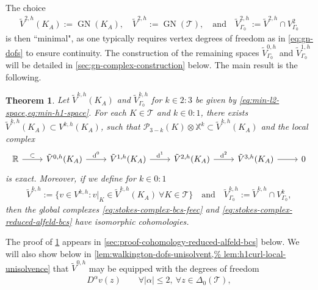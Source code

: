 \documentclass{mcom-l}
\newtheorem{theorem}{Theorem}[section]
\theoremstyle{definition}
\theoremstyle{remark}
\numberwithin{equation}{section}
\DeclareMathOperator{\GN}{GN}
\DeclareMathOperator{\dee}{d}
\newcommand{\mesh}[0]{\mathcal{T}}
\begin{document}
The choice 
\begin{align}
	\label{eq:min-h1-space}
	\tilde{V}^{2, h}(K_A) := \GN(K_A), \quad  
	\tilde{V}^{2, h} := \GN(\mesh), \quad \text{and} \quad 
	\tilde{V}^{2, h}_{\Gamma_0} := \tilde{V}^{2, h} \cap V^2_{\Gamma_0}
\end{align}
is then ``minimal", 
as one typically requires vertex degrees of freedom as in \cref{eq:gn-dofs} 
to ensure continuity. The construction of the remaining spaces 
$\tilde{V}_{\Gamma_0}^{0, h}$ and $\tilde{V}_{\Gamma_0}^{1, h}$ will be detailed in 
\cref{sec:gn-complex-construction} below. The main result is the following.

\begin{theorem}
	\label{thm:cohomology-reduced-alfeld-bcs}
	Let $\tilde{V}^{k, h}(K_A)$ and $\tilde{V}^{k, h}_{\Gamma_0}$ for $k \in 2:3$
	be given by \cref{eq:min-l2-space,eq:min-h1-space}.
	For each $K \in \mesh$ and $k \in 0:1$,
	there exists $\tilde{V}^{k, h}(K_A) \subset V^{k, h}(K_A)$,
	such that
	$\mathcal{P}_{3-k}(K) \otimes \mathbb{X}^k \subset \tilde{V}^{k, h}(K_A)$ 
	and the local complex 
	\begin{equation}
		\label{eq:stokes-complex-reduced-alfeld-element}
		\begin{tikzcd}
			\mathbb{R} \arrow[r, "\subset"] 
			& \tilde{V}^{0, h}(K_A) \arrow[r, "\dee^0"] 
			& \tilde{V}^{1, h}(K_A) \arrow[r, "\dee^1"] 
			& \tilde{V}^{2, h}(K_A) \arrow[r, "\dee^2"]
			& \tilde{V}^{3, h}(K_A) \arrow[r]
			& 0
		\end{tikzcd}
	\end{equation}
	is exact. Moreover, if we define for $k \in 0:1$
	\begin{align}
		\label{eq:min-h2h1curl-space}
		\tilde{V}^{k, h} := \{ v \in V^{k, h} : 
		v|_{K} \in \tilde{V}^{k, h}(K_A) 
		\ \forall K \in \mesh \} 
		\quad \text{and} \quad 
		\tilde{V}^{k, h}_{\Gamma_0} := \tilde{V}^{k, h} \cap V^k_{\Gamma_0},
	\end{align}
	then the global complexes \cref{eq:stokes-complex-bcs-feec} and 
	\cref{eq:stokes-complex-reduced-alfeld-bcs}
	have isomorphic cohomologies.
\end{theorem}
\noindent The proof of \cref{thm:cohomology-reduced-alfeld-bcs} appears in 
\cref{sec:proof-cohomology-reduced-alfeld-bcs} below. 
We will also show below in \cref{lem:walkington-dofs-unisolvent,%
	lem:h1curl-local-unisolvence} that 
$\tilde{V}^{0, h}$ may be equipped with the degrees of freedom 
\begin{align}
	\label{eq:walkington-dofs}
	D^{\alpha} v(z) \qquad \forall |\alpha| \leq 2, 
	\ \forall z \in \Delta_0(\mesh),
\end{align}
\end{document}
